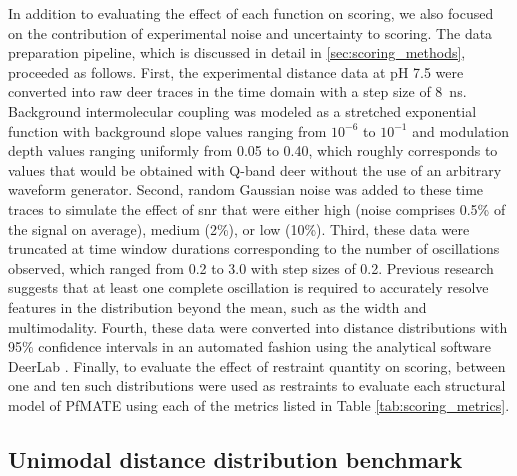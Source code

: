 In addition to evaluating the effect of each function on scoring, we also focused on the contribution of experimental noise and uncertainty to scoring. The data preparation pipeline, which is discussed in detail in \ref{sec:scoring_methods}, proceeded as follows. First, the experimental distance data at pH 7.5 were converted into raw \gls{deer} traces in the time domain with a step size of \SI{8}{ns}. Background intermolecular coupling was modeled as a stretched exponential function with background slope values ranging from $10^{-6}$ to $10^{-1}$ and modulation depth values ranging uniformly from 0.05 to 0.40, which roughly corresponds to values that would be obtained with Q-band \gls{deer} without the use of an arbitrary waveform generator.  Second, random Gaussian noise was added to these time traces to simulate the effect of \gls{snr} that were either high (noise comprises 0.5\% of the signal on average), medium (2\%), or low (10\%). Third, these data were truncated at time window durations corresponding to the number of oscillations observed, which ranged from 0.2 to 3.0 with step sizes of 0.2. Previous research suggests that at least one complete oscillation is required to accurately resolve features in the distribution beyond the mean, such as the width and multimodality. Fourth, these data were converted into distance distributions with 95\% confidence intervals in an automated fashion using the analytical software DeerLab \citep*{FabregasIbanez2020a}. Finally, to evaluate the effect of restraint quantity on scoring, between one and ten such distributions were used as restraints to evaluate each structural model of PfMATE using each of the metrics listed in Table \ref{tab:scoring_metrics}.

\subsection{Unimodal distance distribution benchmark}

